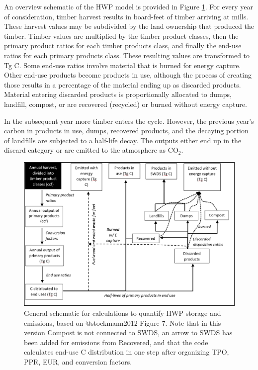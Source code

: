 \documentclass[
]{book}
\begin{document}
An overview schematic of the HWP model is provided in Figure \ref{fig:overview-fig}. For every year of consideration, timber harvest results in board-feet of timber arriving at mills. These harvest values may be subdivided by the land ownership that produced the timber. Timber values are multiplied by the timber product classes, then the primary product ratios for each timber products class, and finally the end-use ratios for each primary products class. These resulting values are transformed to Tg C. Some end-use ratios involve material that is burned for energy capture. Other end-use products become products in use, although the process of creating those results in a percentage of the material ending up as discarded products. Material entering discarded products is proportionally allocated to dumps, landfill, compost, or are recovered (recycled) or burned without energy capture.

In the subsequent year more timber enters the cycle. However, the previous year's carbon in products in use, dumps, recovered products, and the decaying portion of landfills are subjected to a half-life decay. The outputs either end up in the discard category or are emitted to the atmosphere as CO\(_2\).

\begin{figure}
\includegraphics[width=1\linewidth]{images/OverviewModelSchematic} \caption{General schematic for calculations to quantify HWP storage and emissions, based on @stockmann2012 Figure 7.  Note that in this version Compost is not connected to SWDS, an arrow to SWDS has been added for emissions from Recovered, and that the code calculates end-use C distribution in one step after organizing TPO, PPR, EUR, and conversion factors.}\label{fig:overview-fig}
\end{figure}
\end{document}
